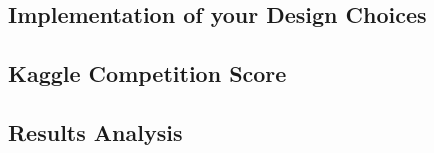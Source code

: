 \documentclass[12pt]{article}
\begin{document}
\subsection{Implementation of your Design Choices}

\subsection{Kaggle Competition Score}

\subsection{Results Analysis}
\end{document}
